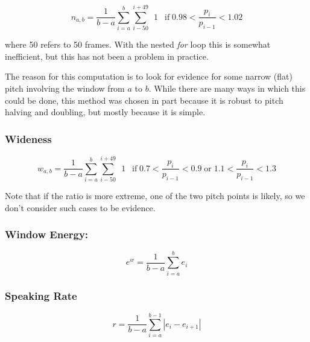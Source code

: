 \documentclass[11pt]{article}
\begin{document}
\begin{equation}
n_{a,b} = \frac{1}{b-a} \sum\limits_{i=a}^b \sum\limits_{i-50}^{i+49} \enspace 1 \enspace \operatorname{if} 0.98 <  \frac{p_i}{p_{i-1}} < 1.02 
\end{equation}

where 50 refers to 50 frames.  With the nested {\em for} loop this is
somewhat inefficient, but this has not been a problem in practice.

The reason for this computation is to look for evidence for some
narrow (flat) pitch involving the window from $a$ to $b$.  While there
are many ways in which this could be done, this method was chosen in
part because it is robust to pitch halving and doubling, but mostly
because it is simple.




\subsubsection{Wideness}

\begin{equation}
w_{a,b} = \frac{1}{b-a} \sum\limits_{i=a}^b \sum\limits_{i-50}^{i+49} \enspace 1 \enspace \operatorname{if} 0.7 <  \frac{p_i}{p_{i-1}} < 0.9 \operatorname{or} 1.1 <  \frac{p_i}{p_{i-1}} < 1.3
\end{equation}

Note that if the ratio is more extreme, one of the two pitch points is
likely, so we don't consider such cases to be evidence.


\bigskip
\subsubsection{Window Energy:}

\begin{equation}
e^w = \frac{1}{b - a} \sum\limits_{i=a}^{b}e_i
\end{equation}

\subsubsection{Speaking Rate}
\begin{equation}
r = \frac{1}{b - a} \sum\limits_{i=a}^{b-1}|e_i - e_{i+1}|
\end{equation}
\end{document}
